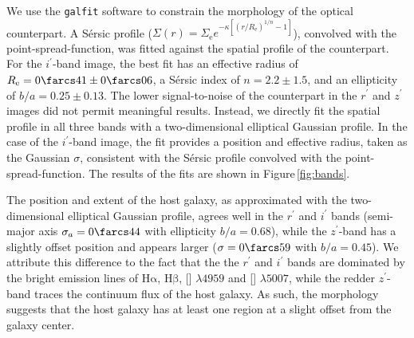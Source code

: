\documentclass[twocolumn]{aastex61}
\def \halpha {\ensuremath{\mathrm{H\alpha}}}
\def \hbeta {\ensuremath{\mathrm{H\beta}}}
\begin{document}
We use the \texttt{galfit} software \citep{phir02,phir10} to constrain
the morphology of the optical counterpart. A S\'ersic profile
($\Sigma(r)=\Sigma_\mathrm{e}e^{-\kappa[(r/R_\mathrm{e})^{1/n}-1]}$),
convolved with the point-spread-function, was fitted against the
spatial profile of the counterpart. For the $i^\prime$-band image, the
best fit has an effective radius of
$R_\mathrm{e}=0\farcs41\pm0\farcs06$, a S\'ersic index of
$n=2.2\pm1.5$, and an ellipticity of $b/a=0.25\pm0.13$. The lower
signal-to-noise of the counterpart in the $r^\prime$ and $z^\prime$
images did not permit meaningful results. Instead, we directly fit the
spatial profile in all three bands with a two-dimensional elliptical
Gaussian profile. In the case of the $i^\prime$-band image, the fit
provides a position and effective radius, taken as the Gaussian
$\sigma$, consistent with the S\'ersic profile convolved with the
point-spread-function. The results of the fits are shown in
Figure\,\ref{fig:bands}.

The position and extent of the host galaxy, as approximated with the
two-dimensional elliptical Gaussian profile, agrees well in the
$r^\prime$ and $i^\prime$ bands (semi-major axis $\sigma_a=0\farcs44$ with
ellipticity $b/a=0.68$), while the $z^\prime$-band has a
slightly offset position and appears larger ($\sigma=0\farcs59$ with
 $b/a=0.45$). We attribute this difference to the fact that the
the $r^\prime$ and $i^\prime$ bands are dominated by the bright
emission lines of \halpha, \hbeta, [] $\lambda4959$ and
[] $\lambda5007$, while the redder $z^\prime$-band traces
the continuum flux of the host galaxy. As such, the morphology
suggests that the host galaxy has at least one  region
at a slight offset from the galaxy center.

\end{document}
